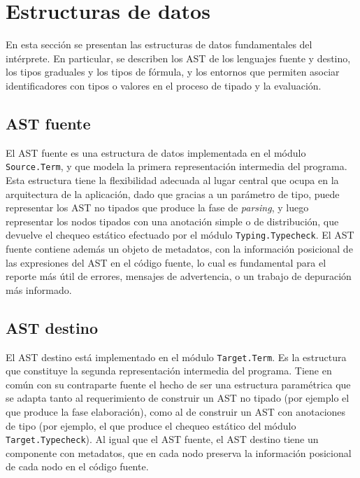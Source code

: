 \section{Estructuras de datos}
En esta sección se presentan las estructuras de datos fundamentales del
intérprete. En particular, se describen los AST de los lenguajes fuente
y destino, los tipos graduales y los tipos de fórmula, y los entornos que permiten
asociar identificadores con tipos o valores en el proceso de tipado
y la evaluación.

\subsection{AST fuente}
El AST fuente es una estructura de datos implementada en el módulo
\verb|Source.Term|, y que modela la primera representación intermedia
del programa. Esta estructura tiene la flexibilidad adecuada al lugar
central que ocupa en la arquitectura de la aplicación, dado que
gracias a un parámetro de tipo, puede representar los AST no tipados
que produce la fase de \emph{parsing}, y luego representar los nodos
tipados con una anotación simple o de distribución, que devuelve el
chequeo estático efectuado por el módulo \verb|Typing.Typecheck|. El
AST fuente contiene además un objeto de metadatos, con la información
posicional de las expresiones del AST en el código fuente, lo cual es
fundamental para el reporte más útil de errores, mensajes de advertencia,
o un trabajo de depuración más informado.

\subsection{AST destino}
El AST destino está implementado en el módulo \verb|Target.Term|. Es
la estructura que constituye la segunda representación intermedia del
programa.  Tiene en común con su contraparte fuente el hecho de ser
una estructura paramétrica que se adapta tanto al requerimiento de
construir un AST no tipado (por ejemplo el que produce la fase
elaboración), como al de construir un AST con anotaciones de tipo (por
ejemplo, el que produce el chequeo estático del módulo
\verb|Target.Typecheck|). Al igual que el AST fuente, el AST destino
tiene un componente con metadatos, que en cada nodo preserva la
información posicional de cada nodo en el código fuente.


